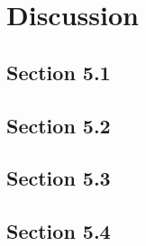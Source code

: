 

\chapter{Discussion}\label{chap:5}

    \section{Section 5.1}\label{section5.1}
    
\lipsum[1-2] %
    
    \section{Section 5.2}\label{section5.2}
    
\lipsum[1-2]
    
    \section{Section 5.3}\label{section5.3}
    
\lipsum[1-2]
    
    \section{Section 5.4}\label{section5.4}

\lipsum[1-2]
